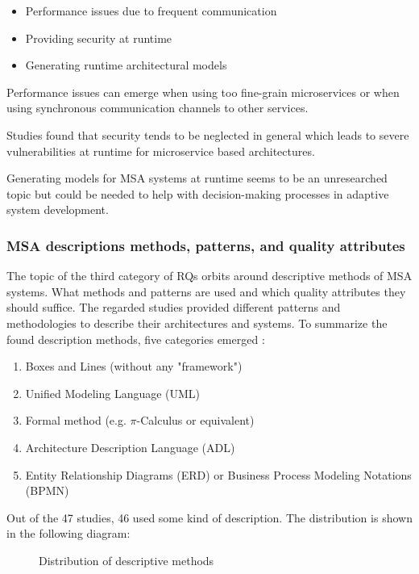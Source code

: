 \begin{itemize}
    \item Performance issues due to frequent communication
    \item Providing security at runtime
    \item Generating runtime architectural models
\end{itemize}

Performance issues can emerge when using too fine-grain microservices
or when using synchronous communication channels to other services.

Studies found that security tends to be neglected in general which leads 
to severe vulnerabilities at runtime for microservice based architectures.

Generating models for MSA systems at runtime seems to be an unresearched
topic but could be needed to help with decision-making processes in
adaptive system development.

\subsubsection{MSA descriptions methods, patterns, and quality attributes}

The topic of the third category of RQs orbits around descriptive methods
of MSA systems. What methods and patterns are used and which
quality attributes they should suffice. The regarded studies provided
different patterns and methodologies to describe their architectures
and systems. To summarize the found description methods, five categories
emerged \cite{waseem:SMSMSADevOps}:

\begin{enumerate}
    \item Boxes and Lines (without any "framework")
    \item Unified Modeling Language (UML)
    \item Formal method (e.g. $\pi$-Calculus or equivalent)
    \item Architecture Description Language (ADL)
    \item Entity Relationship Diagrams (ERD) or Business
    Process Modeling Notations (BPMN)
\end{enumerate}

Out of the 47 studies, 46 used some kind of description.
The distribution is shown in the following diagram:

\begin{figure}[H]
    \caption{Distribution of descriptive methods}
\end{figure}

